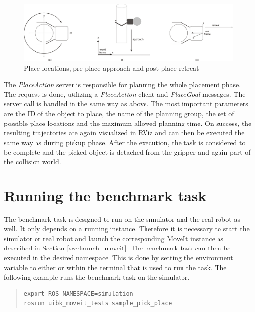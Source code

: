 \begin{figure}[ht]
	\centering
  	\includegraphics[width=1.0\textwidth]{images/place_a-c.jpg}
	\caption{Place locations, pre-place approach and post-place retreat}
	\label{fig:place_stages}
\end{figure}

The \emph{PlaceAction} server is responsible for planning the whole placement phase. The request is done, utilizing a \emph{PlaceAction} client and \emph{PlaceGoal} messages. The server call is handled in the same way as above. The most important parameters are the ID of the object to place, the name of the planning group, the set of possible place locations and the maximum allowed planning time.  On success, the resulting trajectories are again visualized in RViz and can then be executed the same way as during pickup phase. After the execution, the task is considered to be complete and the picked object is detached from the gripper and again part of the collision world.


\section{Running the benchmark task}

The benchmark task is designed to run on the simulator and the real robot as well. It only depends on a running  instance. Therefore it is necessary to start the simulator or real robot and launch the corresponding MoveIt instance as described in Section \ref{sec:launch_moveit}. The benchmark task can then be executed in the desired namespace. This is done by setting the  environment variable to either  or  within the terminal that is used to run the task. The following example runs the benchmark task on the simulator.

\begin{quote}
\begin{verbatim}
export ROS_NAMESPACE=simulation
rosrun uibk_moveit_tests sample_pick_place 
\end{verbatim}
\end{quote}

